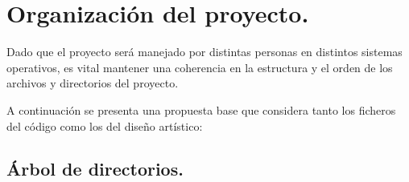 \section{Organización del proyecto.}\label{organizacion:organizacion-del-proyecto}

Dado que el proyecto será manejado por distintas personas en distintos sistemas operativos, es vital mantener una coherencia en la estructura y el orden de los archivos y directorios del proyecto.

A continuación se presenta una propuesta base que considera tanto los ficheros del código como los del diseño artístico:

\subsection{Árbol de directorios.}\label{organizacion:arbol-de-directorios}

